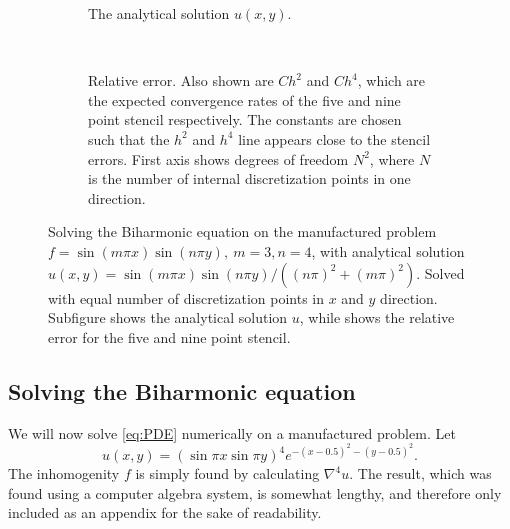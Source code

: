 \begin{figure}[tb]
  \centering
  \begin{subfigure}[t]{0.48\textwidth}
    \caption{The analytical solution $u(x, y)$.}
    \label{fig:pde:order_solution}
  \end{subfigure}
  ~
  \begin{subfigure}[t]{0.48\textwidth}

    \centering 
    \caption{Relative error.
      Also shown are $Ch^2$ and $Ch^4$, which are the expected convergence rates of the five and nine point stencil respectively.
      The constants are chosen such that the $h^2$ and $h^4$ line appears close to the stencil errors.
      First axis shows degrees of freedom $N^2$, where $N$ is the number of internal discretization points in one direction.
    }
    \label{fig:pde:order}
  \end{subfigure}
  \caption{Solving the Biharmonic equation on the manufactured problem $f=\sin(m \pi x)\sin(n\pi y), ~m = 3, n=4$, with analytical solution $u(x, y) = \sin(m \pi x)\sin(n \pi y) / ((n\pi)^2 + (m\pi)^2)$.
    Solved with equal number of discretization points in $x$ and $y$ direction.
    Subfigure  shows the analytical solution $u$, while  shows the relative error for the five and nine point stencil.
  }
\end{figure}


\subsection{Solving the Biharmonic equation}
\label{sec:pde:solving}
We will now solve \eqref{eq:PDE} numerically on a manufactured problem.
Let
$$
u(x, y) =
\left(
\sin \pi x
\sin \pi y
\right)^4
e^{-(x-0.5)^2 - (y-0.5)^2}.
$$
The inhomogenity $f$ is simply found by calculating $\nabla^4 u$.
The result, which was found using a computer algebra system, is somewhat lengthy, and therefore only included as an appendix for the sake of readability.



